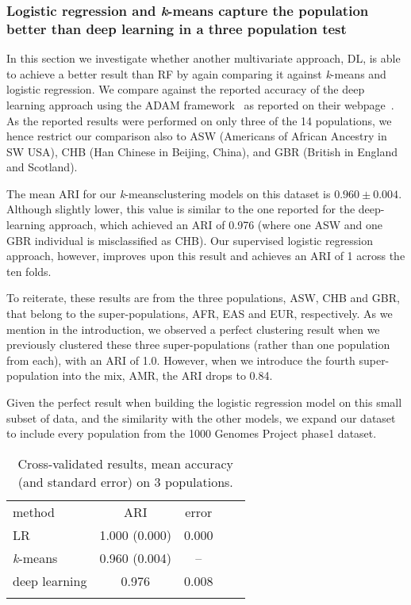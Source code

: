\documentclass{llncs}
\newcommand{\kMeans}{\textit{k}-means}
\begin{document}
{\FloatBarrier
\clearpage
{}
\subsubsection{Logistic regression and \kMeans{} capture the population better than deep learning in a three population test}
In this section we investigate whether another multivariate approach, DL, is able to achieve a better result than
RF by again comparing it against \kMeans{} and logistic regression.  We compare against the reported accuracy of the
deep learning approach using the {\sc ADAM} framework~\cite{Massie2013} as reported on their webpage~\cite{Ferguson}.
As the reported results were performed on only three of the 14 populations, we hence restrict our comparison also to ASW
(Americans of African Ancestry in SW USA), CHB (Han Chinese in Beijing, China), and GBR (British in England and
Scotland).

The mean ARI for our \kMeans clustering models on this dataset is \(0.960 \pm 0.004 \). 
Although slightly lower, this value is similar to the one reported for the deep-learning approach, which achieved an ARI of 0.976 (where one ASW and one GBR individual is misclassified as CHB). 
Our supervised logistic regression approach, however, improves upon this result and achieves an ARI of 1 across the ten folds.

To reiterate, these results are from the three populations, ASW, CHB and GBR, that belong to the super-populations, AFR,
EAS and EUR, respectively.  As we mention in the introduction, we observed a perfect clustering result when we previously clustered
 these three super-populations (rather than one population from each), with an ARI of 1.0. However, when
we introduce the fourth super-population into the mix, AMR, the ARI drops to 0.84.  

Given the perfect result when building
the logistic regression model on this small subset of data, and the similarity with the other models,
we expand our dataset to include every population from the 1000 Genomes Project phase1 dataset.

\begin{table}
\caption{Cross-validated results, mean accuracy (and standard error) on 3 populations.}
\begin{center}
\renewcommand{\arraystretch}{1.4}
\setlength\tabcolsep{3pt}
\begin{tabular}{lcccc}
\hline\noalign{\smallskip}
method  & ARI & error \\
LR  & 1.000 (0.000) & 0.000 \\
\kMeans & 0.960 (0.004) & -- \\
deep learning & 0.976 & 0.008 \\
\noalign{\smallskip}
\hline
\end{tabular}
\end{center}
\end{table}

}
\end{document}
